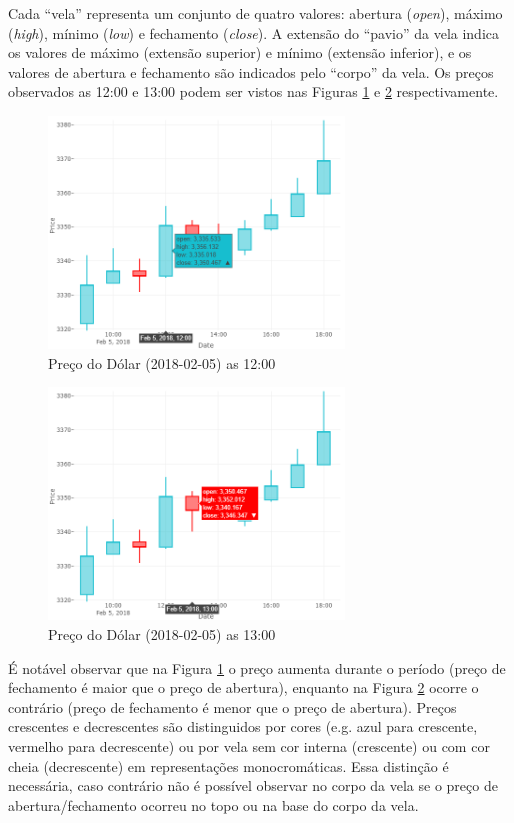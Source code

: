 \documentclass[12pt]{article}
\begin{document}
Cada ``vela'' representa um conjunto de quatro valores: abertura (\textit{open}),
máximo (\textit{high}), mínimo (\textit{low}) e fechamento (\textit{close}).
A extensão do ``pavio'' da vela indica os valores de máximo (extensão superior) e mínimo
(extensão inferior), e os valores de abertura e fechamento são indicados pelo ``corpo'' da vela.
Os preços observados as 12:00 e 13:00 podem ser vistos nas Figuras \ref{fig:rising_price}
e \ref{fig:decreasing_price} respectivamente.

\begin{figure}[H]
	\centering
	\includegraphics[width=0.7\textwidth]{rising_price.png}
	\caption{Preço do Dólar (2018-02-05) as 12:00}
	\label{fig:rising_price}
\end{figure}

\begin{figure}[H]
	\centering
	\includegraphics[width=0.7\textwidth]{decreasing_price.png}
	\caption{Preço do Dólar (2018-02-05) as 13:00}
	\label{fig:decreasing_price}
\end{figure}

É notável observar que na Figura \ref{fig:rising_price} o preço aumenta durante o período
(preço de fechamento é maior que o preço de abertura), enquanto na
Figura \ref{fig:decreasing_price} ocorre o contrário (preço de fechamento é menor 
que o preço de abertura). Preços crescentes e decrescentes são distinguidos por cores
(e.g. azul para crescente, vermelho para decrescente) ou por vela sem cor interna (crescente)
ou com cor cheia (decrescente) em representações monocromáticas. Essa distinção é necessária,
caso contrário não é possível observar no corpo da vela se o preço de abertura/fechamento
ocorreu no topo ou na base do corpo da vela.
\end{document}
